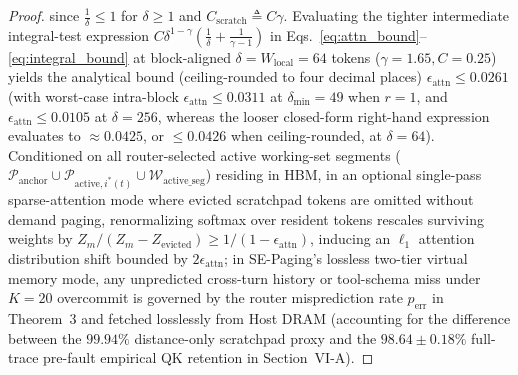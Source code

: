 \documentclass[conference,10pt]{IEEEtran}
\begin{document}
\begin{proof}
since $\frac{1}{\delta} \le 1$ for $\delta \ge 1$ and $C_{\text{scratch}} \triangleq C\gamma$. Evaluating the tighter intermediate integral-test expression $C\delta^{1-\gamma}(\frac{1}{\delta} + \frac{1}{\gamma-1})$ in Eqs.~\eqref{eq:attn_bound}--\eqref{eq:integral_bound} at block-aligned $\delta = W_{\text{local}} = 64$ tokens ($\gamma = 1.65, C = 0.25$) yields the analytical bound (ceiling-rounded to four decimal places) $\epsilon_{\text{attn}} \le 0.0261$ (with worst-case intra-block $\epsilon_{\text{attn}} \le 0.0311$ at $\delta_{\min} = 49$ when $r=1$, and $\epsilon_{\text{attn}} \le 0.0105$ at $\delta = 256$, whereas the looser closed-form right-hand expression evaluates to $\approx 0.0425$, or $\le 0.0426$ when ceiling-rounded, at $\delta = 64$). Conditioned on all router-selected active working-set segments ($\mathcal{P}_{\text{anchor}} \cup \mathcal{P}_{\text{active}, i^*(t)} \cup \mathcal{W}_{\text{active\_seg}}$) residing in HBM, in an optional single-pass sparse-attention mode where evicted scratchpad tokens are omitted without demand paging, renormalizing softmax over resident tokens rescales surviving weights by $Z_m/(Z_m - Z_{\text{evicted}}) \ge 1/(1-\epsilon_{\text{attn}})$, inducing an $\ell_1$ attention distribution shift bounded by $2\epsilon_{\text{attn}}$; in SE-Paging's lossless two-tier virtual memory mode, any unpredicted cross-turn history or tool-schema miss under $K=20$ overcommit is governed by the router misprediction rate $p_{\text{err}}$ in Theorem~3 and fetched losslessly from Host DRAM (accounting for the difference between the $99.94\%$ distance-only scratchpad proxy and the $98.64 \pm 0.18\%$ full-trace pre-fault empirical QK retention in Section~VI-A).
\end{proof}
\end{document}
